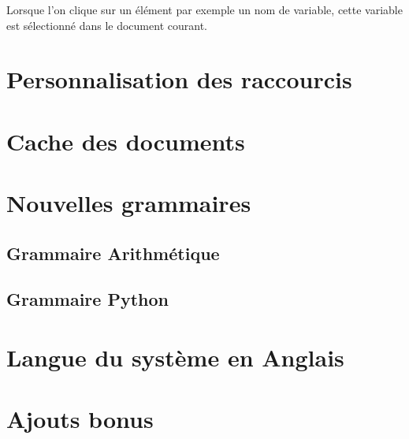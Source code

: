\documentclass[a4paper,12pt]{article}
\begin{document}
	Lorsque l'on clique sur un élément par exemple un nom de variable, cette variable est sélectionné dans le document courant.

\section{Personnalisation des raccourcis}

\section{Cache des documents}

\section{Nouvelles grammaires}

	\subsection{Grammaire Arithmétique}
	
	\subsection{Grammaire Python}
	
\section{Langue du système en Anglais}

\section{Ajouts bonus}

	
\end{document}
